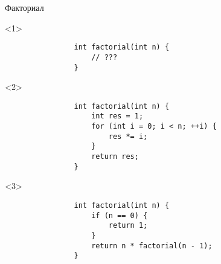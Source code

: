\documentclass[aspectratio=169,14pt]{beamer}
\begin{document}
    \begin{frame}[fragile]{Факториал}
        \begin{onlyenv}<1>
            \begin{verbatim}
                int factorial(int n) {
                    // ???
                }
            \end{verbatim}
        \end{onlyenv}
        \begin{onlyenv}<2>
            \begin{verbatim}
                int factorial(int n) {
                    int res = 1;
                    for (int i = 0; i < n; ++i) {
                        res *= i;
                    }
                    return res;
                }
            \end{verbatim}
        \end{onlyenv}
        \begin{onlyenv}<3>
            \begin{verbatim}
                int factorial(int n) {
                    if (n == 0) {
                        return 1;
                    }
                    return n * factorial(n - 1);
                }
            \end{verbatim}
        \end{onlyenv}
    \end{frame}
\end{document}
